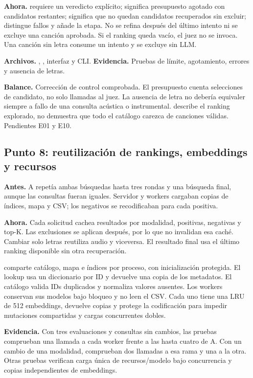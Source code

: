 \textbf{Ahora.}  requiere un veredicto explícito;
 significa presupuesto agotado con candidatos restantes;
 significa que no quedan candidatos recuperados sin excluir;
 distingue fallos y añade la etapa. No se refina después del último
intento ni se excluye una canción aprobada. Si el ranking queda vacío, el juez
no se invoca. Una canción sin letra consume un intento y se excluye sin LLM.

\textbf{Archivos.} , , interfaz y CLI.
\textbf{Evidencia.} Pruebas de límite, agotamiento, errores y ausencia de letras.

\textbf{Balance.} Corrección de control comprobada. El presupuesto cuenta
selecciones de candidato, no solo llamadas al juez. La ausencia de letra no
debería equivaler siempre a fallo de una consulta acústica o instrumental.
 describe el ranking explorado, no demuestra que todo el
catálogo carezca de canciones válidas. Pendientes E01 y E10.

\subsection{Punto 8: reutilización de rankings, embeddings y recursos}
\label{cambio:8}
\textbf{Antes.} A repetía ambas búsquedas hasta tres rondas y una búsqueda final,
aunque las consultas fueran iguales. Servidor y workers cargaban copias de
índices, mapa y CSV; los negativos se recodificaban para cada positiva.

\textbf{Ahora.} Cada solicitud cachea resultados por modalidad, positivas,
negativas y top-K. Las exclusiones se aplican después, por lo que no invalidan
esa caché. Cambiar solo letras reutiliza audio y viceversa. El resultado final
usa el último ranking disponible sin otra recuperación.

 comparte catálogo, mapa e índices por proceso, con
inicialización protegida. El lookup usa un diccionario por ID y devuelve una
copia de los metadatos. El catálogo valida IDs duplicados y normaliza valores
ausentes. Los workers conservan sus modelos bajo bloqueo y no leen el CSV.
Cada uno tiene una LRU de 512 embeddings, devuelve copias y protege la
codificación para impedir mutaciones compartidas y cargas concurrentes dobles.

\textbf{Evidencia.} Con tres evaluaciones y consultas sin cambios, las pruebas
comprueban una llamada a cada worker frente a las hasta cuatro de A. Con un
cambio de una modalidad, comprueban dos llamadas a esa rama y una a la otra.
Otras pruebas verifican carga única de recursos/modelo bajo concurrencia y
copias independientes de embeddings.

